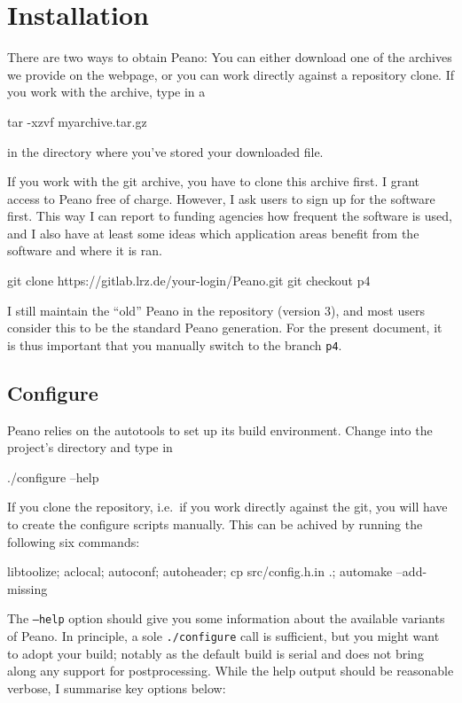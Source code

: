 \chapter{Installation}

There are two ways to obtain Peano: 
You can either download one of the archives we provide on the webpage, or you
can work directly against a repository clone.
If you work with the archive, type in a 
\begin{code}
tar -xzvf myarchive.tar.gz
\end{code}
in the directory where you've stored your downloaded file.


If you work with the git archive, you have to clone this archive first. 
I grant access to Peano free of charge.
However, I ask users to sign up for the software first.
This way I can report to funding agencies how frequent the software is used, and
I also have at least some ideas which application areas benefit from the
software and where it is ran.
\begin{code}
git clone https://gitlab.lrz.de/your-login/Peano.git
git checkout p4
\end{code}


I still maintain the ``old'' Peano in the repository (version 3), and most users
consider this to be the standard Peano generation.
For the present document, it is thus important that you manually switch to the
branch \texttt{p4}.


\section{Configure}

Peano relies on the autotools to set up its build environment.
Change into the project's directory and type in 
\begin{code}
./configure --help
\end{code}


\begin{remark}
 If you clone the repository, i.e.~if you work directly against the git, you
 will have to create the configure scripts manually. 
 This can be achived by running the following six commands:  
 \begin{code}
 libtoolize; aclocal; autoconf; autoheader; 
 cp src/config.h.in .; 
 automake --add-missing
 \end{code}
\end{remark}


The \texttt{--help} option should give you some information about the available
variants of Peano.
In principle, a sole \texttt{./configure} call is sufficient, but you might want
to adopt your build; notably as the default build is serial and does not bring
along any support for postprocessing.
While the help output should be reasonable verbose, I summarise key options
below:

